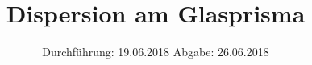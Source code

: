 
\usepackage{longtable}
\usepackage{wrapfig}
\usepackage{ dsfont }
\subject{VERSUCH 402}
\title{Dispersion am Glasprisma}
\date{%
  \hspace{-2.5em}
  Durchführung: 19.06.2018
  \hspace{4em}
  Abgabe: 26.06.2018
}


  \setlength{\parindent}{0em}
  \maketitle
  \thispagestyle{empty}
  \newpage
  \tableofcontents
  \newpage





\printbibliography{}



